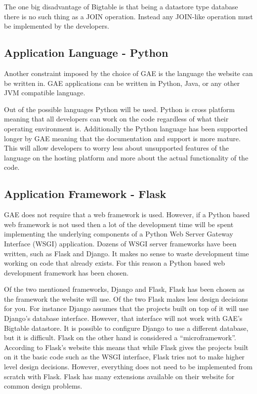 \documentclass{article}
\begin{document}
The one big disadvantage of Bigtable is that being a datastore type database there is no such thing as a JOIN operation. 
Instead any JOIN-like operation must be implemented by the developers.

\subsection{Application Language - Python}

Another constraint imposed by the choice of GAE is the language the website can be written in. GAE applications can
be written in Python, Java, or any other JVM compatible language. \cite{google_google_2012}

Out of the possible languages Python will be used. Python is cross platform meaning that all developers can
work on the code regardless of what their operating environment is. Additionally the Python language has been supported
longer by GAE meaning that the documentation and support is more mature. This will allow developers to worry less about
unsupported features of the language on the hosting platform and more about the actual functionality of the code.

\subsection{Application Framework - Flask}

GAE does not require that a web framework is used. However, if a Python based web framework is not used then a lot of
the development time will be spent implementing the underlying components of a Python Web Server Gateway Interface (WSGI) application. \cite{wsgi.org_what_2012} Dozens of WSGI server frameworks have been written, such as Flask and Django. \cite{_flask_2010} \cite{_django_2012} It makes no sense to waste development time working on code that already exists. For this reason a Python based web development framework has been chosen.

Of the two mentioned frameworks, Django and Flask, Flask has been chosen as the framework the website will use. Of
the two Flask makes less design decisions for you. For instance Django assumes that the projects built on top of it will
use Django's database interface. However, that interface will not work with GAE's Bigtable datastore. It is possible to configure Django to use a different database, but it is difficult. Flask on the other hand is considered a ``microframework''.
According to Flask's website this means that while Flask gives the projects built on it the basic code such as the WSGI 
interface, Flask tries not to make higher level design decisions. However, everything does not need to be implemented from scratch with Flask. Flask has many extensions available on their website for common design problems. \cite{extensions_flask_2012}
\end{document}
